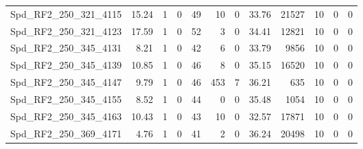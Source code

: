\begin{longtable}[c]{@{}lrrrrrrrrrrr@{}}
Spd\_RF2\_250\_321\_4115     & 15.24                  & 1                       & 0                       & 49                     & 10                      & 0                       & 33.76                   & 21527                    & 10                       & 0                        & 0                        \\
Spd\_RF2\_250\_321\_4123     & 17.59                  & 1                       & 0                       & 52                     & 3                       & 0                       & 34.41                   & 12821                    & 10                       & 0                        & 0                        \\
Spd\_RF2\_250\_345\_4131     & 8.21                   & 1                       & 0                       & 42                     & 6                       & 0                       & 33.79                   & 9856                     & 10                       & 0                        & 0                        \\
Spd\_RF2\_250\_345\_4139     & 10.85                  & 1                       & 0                       & 46                     & 8                       & 0                       & 35.15                   & 16520                    & 10                       & 0                        & 0                        \\
Spd\_RF2\_250\_345\_4147     & 9.79                   & 1                       & 0                       & 46                     & 453                     & 7                       & 36.21                   & 635                      & 10                       & 0                        & 0                        \\
Spd\_RF2\_250\_345\_4155     & 8.52                   & 1                       & 0                       & 44                     & 0                       & 0                       & 35.48                   & 1054                     & 10                       & 0                        & 0                        \\
Spd\_RF2\_250\_345\_4163     & 10.43                  & 1                       & 0                       & 43                     & 10                      & 0                       & 32.57                   & 17871                    & 10                       & 0                        & 0                        \\
Spd\_RF2\_250\_369\_4171     & 4.76                   & 1                       & 0                       & 41                     & 2                       & 0                       & 36.24                   & 20498                    & 10                       & 0                        & 0                        \\

\end{longtable}
